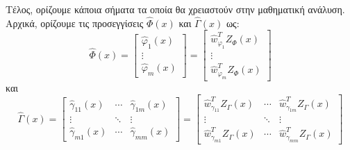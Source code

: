 Τέλος, ορίζουμε κάποια σήματα τα οποία θα χρειαστούν στην μαθηματική ανάλυση. Αρχικά, ορίζουμε τις προσεγγίσεις $\hat{\Phi}(x)$ και $\hat{\Gamma}(x)$ ως:
\begin{equation}
	\hat{\Phi}(x) = 
	\begin{bmatrix}
	\hat{\varphi}_1(x)\\ \vdots \\ \hat{\varphi}_m(x)
	\end{bmatrix}
	= 
	\begin{bmatrix}
	 \hat{w}_{\varphi_1}^T Z_{\Phi}(x) \\ \vdots \\ \hat{w}_{\varphi_m}^T Z_{\Phi}(x)
	\end{bmatrix}
	\label{eq:phi_approx}
\end{equation}
και
\begin{equation}
\hat{\Gamma}(x) = 
\begin{bmatrix} \hat{\gamma}_{11}(x) & \cdots & \hat{\gamma}_{1m}(x) \\
	\vdots    & \ddots & \vdots         \\
	\hat{\gamma}_{m1}(x) & \cdots & \hat{\gamma}_{mm}(x)
\end{bmatrix}
=
\begin{bmatrix} \hat{w}_{\gamma_{11}}^T Z_{\Gamma}(x) & \cdots & \hat{w}_{\gamma_{1m}}^T Z_{\Gamma}(x) \\
\vdots    & \ddots & \vdots         \\
\hat{w}_{\gamma_{m1}}^T Z_{\Gamma}(x) & \cdots & \hat{w}_{\gamma_{mm}}^T Z_{\Gamma}(x)
\end{bmatrix}
\label{eq:gamma_approx}
\end{equation}

